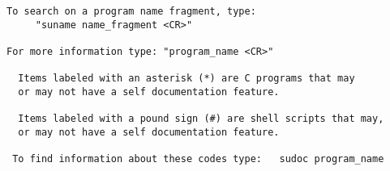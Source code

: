 {\begin{verbatim}
To search on a program name fragment, type:
     "suname name_fragment <CR>"

For more information type: "program_name <CR>"

  Items labeled with an asterisk (*) are C programs that may
  or may not have a self documentation feature.

  Items labeled with a pound sign (#) are shell scripts that may,
  or may not have a self documentation feature.

 To find information about these codes type:   sudoc program_name
\end{verbatim}}
